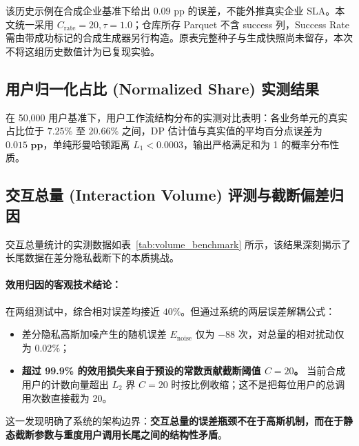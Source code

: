 该历史示例在合成企业基准下给出 $0.09\text{ pp}$ 的误差，不能外推真实企业 SLA。本文统一采用 $C_{\text{rate}}=20,\tau=1.0$；仓库所存 Parquet 不含 success 列，Success Rate 需由带成功标记的合成生成器另行构造。原表完整种子与生成快照尚未留存，本次不将这组历史数值计为已复现实验。

\subsection{用户归一化占比 (Normalized Share) 实测结果}
在 50,000 用户基准下，用户工作流结构分布的实测对比表明：各业务单元的真实占比位于 $7.25\%$ 至 $20.66\%$ 之间，DP 估计值与真实值的平均百分点误差为 $\mathbf{0.015\text{ pp}}$，单纯形曼哈顿距离 $L_1 < 0.0003$，输出严格满足和为 1 的概率分布性质。

\subsection{交互总量 (Interaction Volume) 评测与截断偏差归因}
交互总量统计的实测数据如表~\ref{tab:volume_benchmark} 所示，该结果深刻揭示了长尾数据在差分隐私截断下的本质挑战。

\begin{table}[htbp]
\centering
\small
\caption{交互总量 (Interaction Volume) 两层误差解耦实测数据表 ($C=20, \varepsilon=1.0, \delta=10^{-6}$)}
\label{tab:volume_benchmark}
\end{table}

\paragraph{效用归因的客观技术结论：}
在两组测试中，综合相对误差均接近 $40\%$。但通过系统的两层误差解耦公式：
\begin{itemize}[leftmargin=2em]
  \item 差分隐私高斯加噪产生的随机误差 $E_{\text{noise}}$ 仅为 $-88$ 次，对总量的相对扰动仅为 $\mathbf{0.02\%}$；
  \item \textbf{超过 99.9\% 的效用损失来自于预设的常数贡献截断阈值 $C=20$。} 当前合成用户的计数向量超出 $L_2$ 界 $C=20$ 时按比例收缩；这不是把每位用户的总调用次数直接截为 20。
\end{itemize}
这一发现明确了系统的架构边界：\textbf{交互总量的误差瓶颈不在于高斯机制，而在于静态截断参数与重度用户调用长尾之间的结构性矛盾}。

